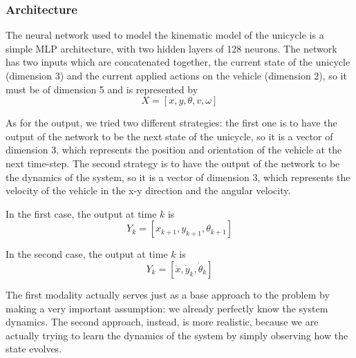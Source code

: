 \subsubsection{Architecture}\label{architecture} The neural network used to
model the kinematic model of the unicycle is a simple MLP architecture,
with two hidden layers of 128 neurons. The network has two inputs which are
concatenated together, the current state of the unicycle (dimension 3) and
the current applied actions on the vehicle (dimension 2), so it must be of
dimension 5 and is represented by 
\begin{equation}
    X = [x, y, \theta, v, \omega]
\end{equation}

As for the output, we tried two different strategies: the first one is to
have the output of the network to be the next state of the unicycle, so it
is a vector of dimension 3, which represents the position and orientation
of the vehicle at the next time-step. The second strategy is to have the
output of the network to be the dynamics of the system, so it is a vector
of dimension 3, which represents the velocity of the vehicle in the x-y
direction and the angular velocity.

In the first case, the output at time $k$ is
\begin{equation}
    Y_k = [x_{k+1}, y_{k+1}, \theta_{k+1}]
\end{equation}

In the second case, the output at time $k$ is
\begin{equation}
    Y_k = [\dot{x}, \dot{y}_k, \dot{\theta}_k]
\end{equation}

The first modality actually serves just as a base approach to the problem
by making a very important assumption: we already perfectly know the system
dynamics. The second approach, instead, is more realistic, because we are
actually trying to learn the dynamics of the system by simply observing how
the state evolves. 

